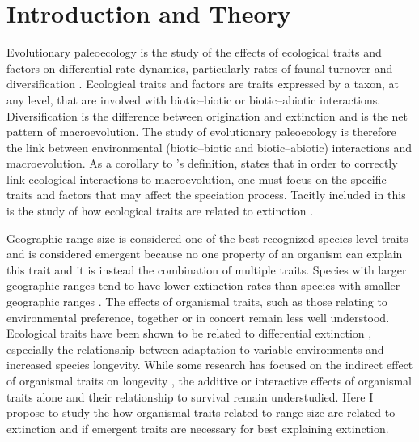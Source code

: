 \documentclass[12pt,letterpaper]{article}
\begin{document}
\section{Introduction and Theory}
%
Evolutionary paleoecology is the study of the effects of ecological traits and factors on differential rate dynamics, particularly rates of faunal turnover and diversification \citep{Kitchell1985a}. Ecological traits and factors are traits expressed by a taxon, at any level, that are involved with biotic--biotic or biotic--abiotic interactions. Diversification is the difference between origination and extinction and is the net pattern of macroevolution. The study of evolutionary paleoecology is therefore the link between environmental (biotic--biotic and biotic--abiotic) interactions and macroevolution. As a corollary to \citet{Kitchell1985a}'s definition, \citet{Allmon1994} states that in order to correctly link ecological interactions to macroevolution, one must focus on the specific traits and factors that may affect the speciation process. Tacitly included in this is the study of how ecological traits are related to extinction \citep{Kitchell1990}.

Geographic range size is considered one of the best recognized species level traits \citep{Jablonski2008a} and is considered emergent because no one property of an organism can explain this trait and it is instead the combination of multiple traits. Species with larger geographic ranges tend to have lower extinction rates than species with smaller geographic ranges \citep{Jablonski1986,Harnik2013,Nurnberg2013a,Jablonski2003,Roy2009c}. The effects of organismal traits, such as those relating to environmental preference, together or in concert remain less well understood. Ecological traits have been shown to be related to differential extinction \citep{Foote2013,Liow2007b,Baumiller1993,Nurnberg2013a}, especially the relationship between adaptation to variable environments and increased species longevity. While some research has focused on the indirect effect of organismal traits on longevity \citep{Harnik2011}, the additive or interactive effects of organismal traits alone and their relationship to survival remain understudied. Here I propose to study the how organismal traits related to range size are related to extinction and if emergent traits are necessary for best explaining extinction.
\end{document}
